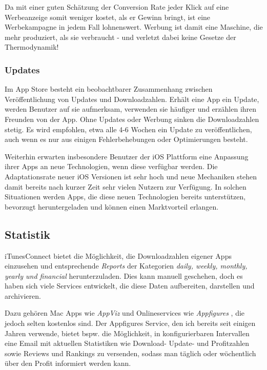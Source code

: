 \documentclass[parskip=half, final]{scrreprt}
\begin{document}
Da mit einer guten Schätzung der Conversion Rate jeder Klick auf eine Werbeanzeige somit weniger kostet, als er Gewinn bringt, ist eine Werbekampagne in jedem Fall lohnenswert. Werbung ist damit eine Maschine, die mehr produziert, als sie verbraucht - und verletzt dabei keine Gesetze der Thermodynamik!

\subsubsection{Updates}

Im App Store besteht ein beobachtbarer Zusammenhang zwischen Veröffentlichung von Updates und Downloadzahlen. Erhält eine App ein Update, werden Benutzer auf sie aufmerksam, verwenden sie häufiger und erzählen ihren Freunden von der App. Ohne Updates oder Werbung sinken die Downloadzahlen stetig. Es wird empfohlen, etwa alle 4-6 Wochen ein Update zu veröffentlichen, auch wenn es nur aus einigen Fehlerbehebungen oder Optimierungen besteht.

Weiterhin erwarten insbesondere Benutzer der iOS Plattform eine Anpassung ihrer Apps an neue Technologien, wenn diese verfügbar werden. Die Adaptationsrate neuer iOS Versionen ist sehr hoch und neue Mechaniken stehen damit bereits nach kurzer Zeit sehr vielen Nutzern zur Verfügung. In solchen Situationen werden Apps, die diese neuen Technologien bereits unterstützen, bevorzugt heruntergeladen und können einen Marktvorteil erlangen.

\subsection{Statistik}

iTunesConnect bietet die Möglichkeit, die Downloadzahlen eigener Apps einzusehen und entsprechende \emph{Reports} der Kategorien \emph{daily, weekly, monthly, yearly und financial} herunterzuladen. Dies kann manuell geschehen, doch es haben sich viele Services entwickelt, die diese Daten aufbereiten, darstellen und archivieren.

Dazu gehören Mac Apps wie \emph{AppViz } und Onlineservices wie \emph{Appfigures }, die jedoch selten kostenlos sind. Der Appfigures Service, den ich bereits seit einigen Jahren verwende, bietet bspw. die Möglichkeit, in konfigurierbaren Intervallen eine Email mit aktuellen Statistiken wie Download- Update- und Profitzahlen sowie Reviews und Rankings zu versenden, sodass man täglich oder wöchentlich über den Profit informiert werden kann.
\end{document}
